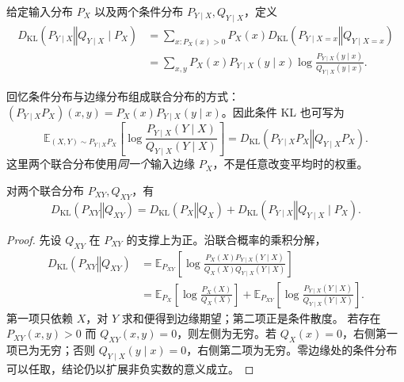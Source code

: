 \documentclass[lang=cn,a4paper,fontset=none,zihao=false,10pt,openany,twoside]{beautybook}
\numberwithin{algorithm}{chapter}
\newcommand{\KLsep}{\mathrel{\Vert}}
\begin{document}
\begin{definition}[条件 KL 散度]\label{def:conditional-kl}
给定输入分布 $P_X$ 以及两个条件分布 $P_{Y\mid X},Q_{Y\mid X}$，定义
\begin{align*}
 D_{\mathrm{KL}}(P_{Y\mid X}\KLsep Q_{Y\mid X}\mid P_X)
 &=\sum_{x:P_X(x)>0}P_X(x)D_{\mathrm{KL}}(P_{Y\mid X=x}\KLsep Q_{Y\mid X=x})\\
 &=\sum_{x,y}P_X(x)P_{Y\mid X}(y\mid x)\log\frac{P_{Y\mid X}(y\mid x)}{Q_{Y\mid X}(y\mid x)}.
\end{align*}
\end{definition}
回忆条件分布与边缘分布组成联合分布的方式：$(P_{Y\mid X}P_X)(x,y)=P_X(x)P_{Y\mid X}(y\mid x)$。因此条件 KL 也可写为
\[
 \mathbb E_{(X,Y)\sim P_{Y\mid X}P_X}
 \left[\log\frac{P_{Y\mid X}(Y\mid X)}{Q_{Y\mid X}(Y\mid X)}\right]
 =D_{\mathrm{KL}}(P_{Y\mid X}P_X\KLsep Q_{Y\mid X}P_X).
\]
这里两个联合分布使用\emph{同一个}输入边缘 $P_X$，不是任意改变平均时的权重。
\begin{proposition}[KL 散度的链式法则]\label{prop:kl-chain}
对两个联合分布 $P_{XY},Q_{XY}$，有
\[
 D_{\mathrm{KL}}(P_{XY}\KLsep Q_{XY})
 =D_{\mathrm{KL}}(P_X\KLsep Q_X)
 +D_{\mathrm{KL}}(P_{Y\mid X}\KLsep Q_{Y\mid X}\mid P_X).
\]
\end{proposition}
\begin{proof}
先设 $Q_{XY}$ 在 $P_{XY}$ 的支撑上为正。沿联合概率的乘积分解，
\begin{align*}
 D_{\mathrm{KL}}(P_{XY}\KLsep Q_{XY})
 &=\mathbb E_{P_{XY}}\left[\log\frac{P_X(X)P_{Y\mid X}(Y\mid X)}{Q_X(X)Q_{Y\mid X}(Y\mid X)}\right]\\
 &=\mathbb E_{P_X}\left[\log\frac{P_X(X)}{Q_X(X)}\right]
 +\mathbb E_{P_{XY}}\left[\log\frac{P_{Y\mid X}(Y\mid X)}{Q_{Y\mid X}(Y\mid X)}\right].
\end{align*}
第一项只依赖 $X$，对 $Y$ 求和便得到边缘期望；第二项正是条件散度。
若存在 $P_{XY}(x,y)>0$ 而 $Q_{XY}(x,y)=0$，则左侧为无穷。若 $Q_X(x)=0$，右侧第一项已为无穷；否则 $Q_{Y\mid X}(y\mid x)=0$，右侧第二项为无穷。零边缘处的条件分布可以任取，结论仍以扩展非负实数的意义成立。
\end{proof}

\FloatBarrier
\end{document}
